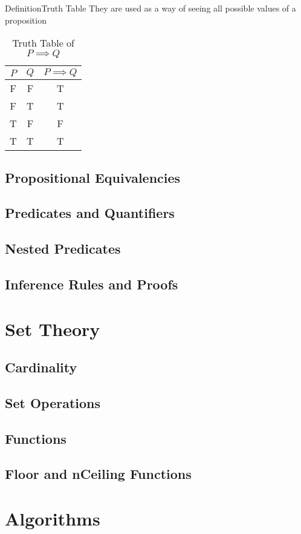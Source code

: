 \documentclass{MathNotes}
\newenvironment{definition}[1]{\begin{RedBox}{Definition}{#1}}{\end{RedBox}}
\begin{document}
\begin{definition}{Truth Table}
They are used as a way of seeing all possible values of a proposition
\end{definition}

\begin{table}[h!]\label{tab:truth-table-example}
\centering
\caption{Truth Table of $P\implies Q$}
\begin{tabular}{cc|c}
$P$ & $Q$ & $P\implies Q$\\
\hline
F & F & T \\
F & T & T \\
T & F & F \\
T & T & T \\
\end{tabular}
\end{table}

\subsection{Propositional Equivalencies}
\subsection{Predicates and Quantifiers}
\subsection{Nested Predicates}
\subsection{Inference Rules and Proofs}
\section{Set Theory}
\subsection{Cardinality}
\subsection{Set Operations}
\subsection{Functions}
\subsection{Floor and nCeiling Functions}
\section{Algorithms}
\end{document}
